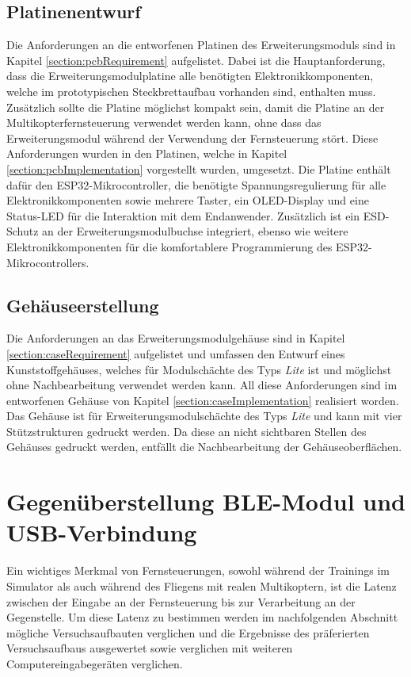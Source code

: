 \subsection{Platinenentwurf}
Die Anforderungen an die entworfenen Platinen des Erweiterungsmoduls sind in Kapitel \ref{section:pcbRequirement} aufgelistet. Dabei ist die Hauptanforderung, dass die Erweiterungsmodulplatine alle benötigten Elektronikkomponenten, welche im prototypischen Steckbrettaufbau vorhanden sind, enthalten muss. Zusätzlich sollte die Platine möglichst kompakt sein, damit die Platine an der Multikopterfernsteuerung verwendet werden kann, ohne dass das Erweiterungsmodul während der Verwendung der Fernsteuerung stört. Diese Anforderungen wurden in den Platinen, welche in Kapitel \ref{section:pcbImplementation} vorgestellt wurden, umgesetzt. Die Platine enthält dafür den ESP32-Mikrocontroller, die benötigte Spannungsregulierung für alle Elektronikkomponenten sowie mehrere Taster, ein \acs{OLED}-Display und eine Status-\acs{LED} für die Interaktion mit dem Endanwender. Zusätzlich ist ein \ac{ESD}-Schutz an der Erweiterungsmodulbuchse integriert, ebenso wie weitere Elektronikkomponenten für die komfortablere Programmierung des ESP32-Mikrocontrollers.

\subsection{Gehäuseerstellung}
Die Anforderungen an das Erweiterungsmodulgehäuse sind in Kapitel \ref{section:caseRequirement} aufgelistet und umfassen den Entwurf eines Kunststoffgehäuses, welches für Modulschächte des Typs \textit{Lite} ist und möglichst ohne Nachbearbeitung verwendet werden kann. All diese Anforderungen sind im entworfenen Gehäuse von Kapitel \ref{section:caseImplementation} realisiert worden. Das Gehäuse ist für Erweiterungsmodulschächte des Typs \textit{Lite} und kann mit vier Stützstrukturen gedruckt werden. Da diese an nicht sichtbaren Stellen des Gehäuses gedruckt werden, entfällt die Nachbearbeitung der Gehäuseoberflächen.

\section{Gegenüberstellung \acs{BLE}-Modul und \acs{USB}-Verbindung}
Ein wichtiges Merkmal von Fernsteuerungen, sowohl während der Trainings im Simulator als auch während des Fliegens mit realen Multikoptern, ist die Latenz zwischen der Eingabe an der Fernsteuerung bis zur Verarbeitung an der Gegenstelle. Um diese Latenz zu bestimmen werden im nachfolgenden Abschnitt mögliche Versuchsaufbauten verglichen und  die Ergebnisse des präferierten Versuchsaufbaus ausgewertet sowie verglichen mit weiteren Computereingabegeräten verglichen.

